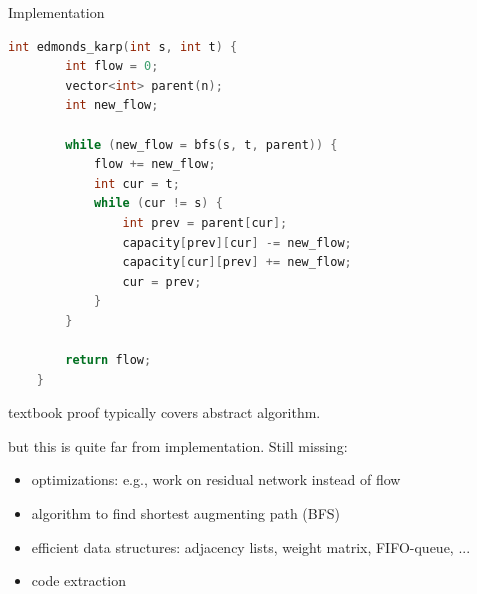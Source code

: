 \documentclass[fleqn]{beamer}
\begin{document}
\begin{frame}[fragile]{Implementation}
  \begin{minipage}{.49\textwidth}
  \footnotesize
  \algoEdka
  \end{minipage}%
  \begin{minipage}{.49\textwidth}
  \tiny
  \begin{lstlisting}[language=C++]
    int edmonds_karp(int s, int t) {
        int flow = 0;
        vector<int> parent(n);
        int new_flow;

        while (new_flow = bfs(s, t, parent)) {
            flow += new_flow;
            int cur = t;
            while (cur != s) {
                int prev = parent[cur];
                capacity[prev][cur] -= new_flow;
                capacity[cur][prev] += new_flow;
                cur = prev;
            }
        }

        return flow;
    }
    \end{lstlisting}
  \end{minipage}



  \onslide<+->
  textbook proof typically covers abstract algorithm.

  \onslide<+->
  but this is quite far from implementation. Still missing:

  \begin{itemize}
   \item<+-> optimizations: e.g., work on residual network instead of flow
   \item<+-> algorithm to find shortest augmenting path (BFS)
   \item<+-> efficient data structures: adjacency lists, weight matrix, FIFO-queue, ...
   \item<+-> code extraction

  \end{itemize}
\end{frame}
\end{document}
